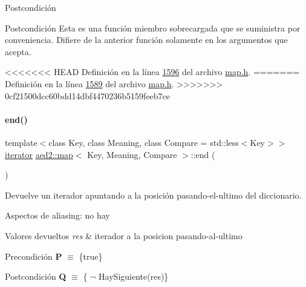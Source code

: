 \begin{DoxyPostcond}{\-Postcondición}
\begin{DoxyPostcond}{\-Postcondición}
Esta es una función miembro sobrecargada que se suministra por conveniencia. Difiere de la anterior función solamente en los argumentos que acepta. 

<<<<<<< HEAD
\-Definición en la línea \hyperlink{map_8h_source_l01596}{1596} del archivo \hyperlink{map_8h_source}{map.\-h}.
=======
Definición en la línea \hyperlink{map_8h_source_l01589}{1589} del archivo \hyperlink{map_8h_source}{map.\+h}.
>>>>>>> 0cf21500dcc60bdd14dbf4470236b5159feeb7ce

\mbox{\label{classaed2_1_1map_a76023e6a56cb625513e1b5ea028bf983_a76023e6a56cb625513e1b5ea028bf983}} 
\paragraph{\texorpdfstring{end()}{end()}\hspace{0.1cm}{\footnotesize\ttfamily [1/2]}}
{\footnotesize\ttfamily template$<$class Key, class Meaning, class Compare = std\+::less$<$\+Key$>$$>$ \\
\hyperlink{classaed2_1_1map_1_1iterator}{iterator} \hyperlink{classaed2_1_1map}{aed2\+::map}$<$ Key, Meaning, Compare $>$\+::end (\begin{DoxyParamCaption}{ }\end{DoxyParamCaption})\hspace{0.3cm}{\ttfamily [inline]}}



Devuelve un iterador apuntando a la posición pasando-\/el-\/ultimo del diccionario. 

\begin{DoxyParagraph}{Aspectos de aliasing\+:}
no hay
\end{DoxyParagraph}

\begin{DoxyRetVals}{Valores devueltos}
{\em res} & iterador a la posicion pasando-\/al-\/ultimo\\
\hline
\end{DoxyRetVals}
\begin{DoxyPrecond}{Precondición}
{\bfseries P} $\equiv$ \{true\} 
\end{DoxyPrecond}
\begin{DoxyPostcond}{Postcondición}
{\bfseries Q} $\equiv$ \{ $\lnot$ Hay\+Siguiente(res)\}
\end{DoxyPostcond}


\end{DoxyPostcond}
\end{DoxyPostcond}
